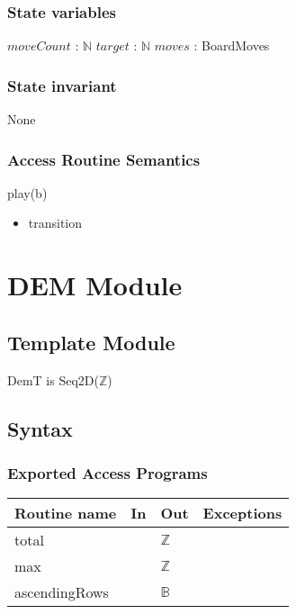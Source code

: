 \documentclass[12pt]{article}
\begin{document}
\subsubsection* {State variables}
\noindent $moveCount$ : $\mathbb{N}$
\noindent $target$ : $\mathbb{N}$
\noindent $moves$ : BoardMoves


\subsubsection*{State invariant}
\noindent None

\subsubsection* {Access Routine Semantics}

\noindent play(b)
\begin{itemize}
\item transition
\end{itemize}

\newpage




\section* {DEM Module}

\subsection* {Template Module}

DemT is Seq2D($\mathbb{Z}$)

\subsection* {Syntax}

\subsubsection* {Exported Access Programs}

\begin{tabular}{| l | l | l | p{6cm} |}
\hline
\textbf{Routine name} & \textbf{In} & \textbf{Out} & \textbf{Exceptions}\\
\hline
total & & $\mathbb{Z}$ & \\
\hline
max &  & $\mathbb{Z}$ & \\
\hline
ascendingRows & & $\mathbb{B}$ & \\
\hline
\end{tabular}
\end{document}
